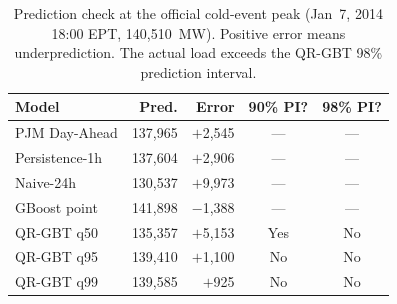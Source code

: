 \begin{table}[htbp]
\centering
\footnotesize
\caption{Prediction check at the official cold-event peak (Jan~7, 2014 18:00 EPT, 140,510~MW). Positive error means underprediction. The actual load exceeds the QR-GBT 98\% prediction interval.}
\label{tab:event_peak}
\begin{tabular}{lrrcc}
\toprule
Model & Pred. & Error & 90\% PI? & 98\% PI? \\
\midrule
PJM Day-Ahead & 137,965 & $+$2,545 & — & — \\
Persistence-1h & 137,604 & $+$2,906 & — & — \\
Naive-24h & 130,537 & $+$9,973 & — & — \\
GBoost point & 141,898 & $-$1,388 & — & — \\
QR-GBT q50 & 135,357 & $+$5,153 & Yes & No \\
QR-GBT q95 & 139,410 & $+$1,100 & No & No \\
QR-GBT q99 & 139,585 & $+$925 & No & No \\
\bottomrule
\end{tabular}
\end{table}